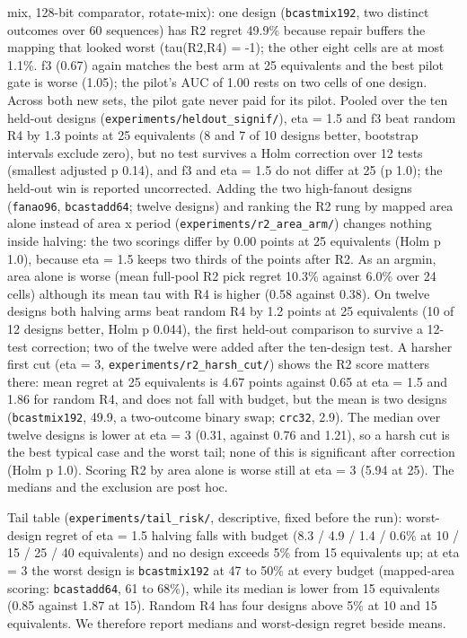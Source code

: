 \documentclass[conference]{IEEEtran}
\begin{document}
mix, 128-bit comparator, rotate-mix): one design (\texttt{bcastmix192},
two distinct outcomes over 60 sequences) has R2 regret 49.9\% because
repair buffers the mapping that looked worst (tau(R2,R4) = -1); the
other eight cells are at most 1.1\%. f3 (0.67) again matches the best
arm at 25 equivalents and the best pilot gate is worse (1.05); the
pilot's AUC of 1.00 rests on two cells of one design. Across both new
sets, the pilot gate never paid for its pilot. Pooled over the ten
held-out designs (\texttt{experiments/\allowbreak{}heldout\_\allowbreak{}signif/\allowbreak{}}), eta = 1.5 and
f3 beat random R4 by 1.3 points at 25 equivalents (8 and 7 of 10 designs
better, bootstrap intervals exclude zero), but no test survives a Holm
correction over 12 tests (smallest adjusted p 0.14), and f3 and eta =
1.5 do not differ at 25 (p 1.0); the held-out win is reported
uncorrected. Adding the two high-fanout designs (\texttt{fanao96},
\texttt{bcastadd64}; twelve designs) and ranking the R2 rung by mapped
area alone instead of area x period
(\texttt{experiments/\allowbreak{}r2\_\allowbreak{}area\_\allowbreak{}arm/\allowbreak{}}) changes nothing inside halving:
the two scorings differ by 0.00 points at 25 equivalents (Holm p 1.0),
because eta = 1.5 keeps two thirds of the points after R2. As an argmin,
area alone is worse (mean full-pool R2 pick regret 10.3\% against 6.0\%
over 24 cells) although its mean tau with R4 is higher (0.58 against
0.38). On twelve designs both halving arms beat random R4 by 1.2 points
at 25 equivalents (10 of 12 designs better, Holm p 0.044), the first
held-out comparison to survive a 12-test correction; two of the twelve
were added after the ten-design test. A harsher first cut (eta = 3,
\texttt{experiments/\allowbreak{}r2\_\allowbreak{}harsh\_\allowbreak{}cut/\allowbreak{}}) shows the R2 score matters there:
mean regret at 25 equivalents is 4.67 points against 0.65 at eta = 1.5
and 1.86 for random R4, and does not fall with budget, but the mean is
two designs (\texttt{bcastmix192}, 49.9, a two-outcome binary swap;
\texttt{crc32}, 2.9). The median over twelve designs is lower at eta = 3
(0.31, against 0.76 and 1.21), so a harsh cut is the best typical case
and the worst tail; none of this is significant after correction (Holm p
1.0). Scoring R2 by area alone is worse still at eta = 3 (5.94 at 25).
The medians and the exclusion are post hoc.

Tail table (\texttt{experiments/\allowbreak{}tail\_\allowbreak{}risk/\allowbreak{}}, descriptive, fixed before
the run): worst-design regret of eta = 1.5 halving falls with budget
(8.3 / 4.9 / 1.4 / 0.6\% at 10 / 15 / 25 / 40 equivalents) and no design
exceeds 5\% from 15 equivalents up; at eta = 3 the worst design is
\texttt{bcastmix192} at 47 to 50\% at every budget (mapped-area scoring:
\texttt{bcastadd64}, 61 to 68\%), while its median is lower from 15
equivalents (0.85 against 1.87 at 15). Random R4 has four designs above
5\% at 10 and 15 equivalents. We therefore report medians and
worst-design regret beside means.
\end{document}
